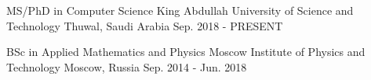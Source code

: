 


\begin{cventries}


\cventry
{MS/PhD in Computer Science } %
{King Abdullah University of Science and Technology} %
{Thuwal, Saudi Arabia} %
{Sep. 2018 - PRESENT} %
{
}

\cventry
{BSc in Applied Mathematics and Physics} %
{Moscow Institute of Physics and Technology} %
{Moscow, Russia} %
{Sep. 2014 - Jun. 2018} %
{ %
}


\end{cventries}